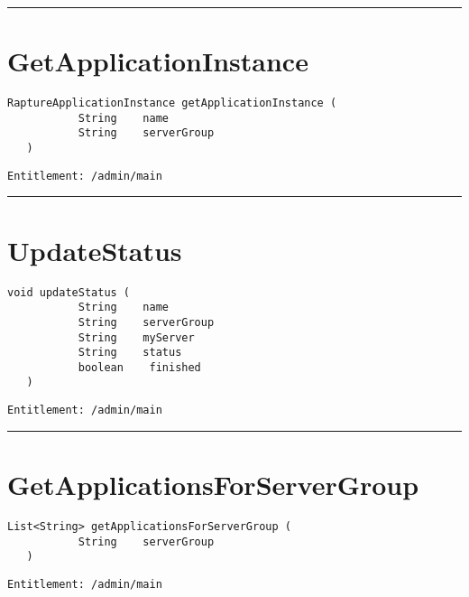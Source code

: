 \rule{12cm}{2pt}
\section{GetApplicationInstance}
\label{Api:GetApplicationInstance}
\begin{lstlisting}[style=nonumbers]
   RaptureApplicationInstance getApplicationInstance (
           String    name
           String    serverGroup
   )
\end{lstlisting}
\begin{Verbatim}[formatcom=\color{Maroon}]
  Entitlement: /admin/main
\end{Verbatim}



\rule{12cm}{2pt}
\section{UpdateStatus}
\label{Api:UpdateStatus}
\begin{lstlisting}[style=nonumbers]
   void updateStatus (
           String    name
           String    serverGroup
           String    myServer
           String    status
           boolean    finished
   )
\end{lstlisting}
\begin{Verbatim}[formatcom=\color{Maroon}]
  Entitlement: /admin/main
\end{Verbatim}



\rule{12cm}{2pt}
\section{GetApplicationsForServerGroup}
\label{Api:GetApplicationsForServerGroup}
\begin{lstlisting}[style=nonumbers]
   List<String> getApplicationsForServerGroup (
           String    serverGroup
   )
\end{lstlisting}
\begin{Verbatim}[formatcom=\color{Maroon}]
  Entitlement: /admin/main
\end{Verbatim}



